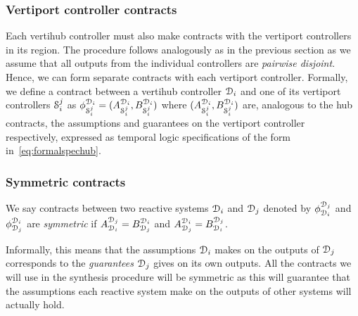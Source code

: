 \subsubsection{Vertiport controller contracts}
Each vertihub controller must also make contracts with the vertiport controllers in its region. The procedure follows analogously as in the previous section as we assume that all outputs from the individual controllers are \emph{pairwise disjoint}. Hence, we can form separate contracts with each vertiport controller. Formally, we define a contract between a vertihub controller $\mathcal{D}_i$ and one of its vertiport controllers $\mathcal{S}_i^j$ as $ \phi_{\mathcal{S}^j_i}^{\mathcal{D}_i} = (A_{\mathcal{S}_i^j}^{\mathcal{D}_i},B_{\mathcal{S}_i^j}^{\mathcal{D}_i})$ where $(A_{\mathcal{S}_i^j}^{\mathcal{D}_i},B_{\mathcal{S}_i^j}^{\mathcal{D}_i})$ are, analogous to the hub contracts, the assumptions and guarantees on the vertiport controller respectively, expressed as temporal logic specifications of the form in~\eqref{eq:formalspechub}. 

\subsubsection{Symmetric contracts}
We say contracts between two reactive systems $\mathcal{D}_i$ and $\mathcal{D}_j$ denoted by $\phi_{\mathcal{D}_i}^{\mathcal{D}_j}  $ and $\phi_{\mathcal{D}_j}^{\mathcal{D}_i}$ are \emph{symmetric} if $A_{\mathcal{D}_i}^{\mathcal{D}_j} = B_{\mathcal{D}_j}^{\mathcal{D}_i}$ and $A_{\mathcal{D}_j}^{\mathcal{D}_i} = B_{\mathcal{D}_i}^{\mathcal{D}_j}$. 

Informally, this means that the assumptions $\mathcal{D}_i$ makes on the outputs of $\mathcal{D}_j$ corresponds to the \emph{guarantees} $\mathcal{D}_j$ gives on its own outputs. All the contracts we will use in the synthesis procedure will be symmetric as this will guarantee that the assumptions each reactive system make on the outputs of other systems will actually hold. 

